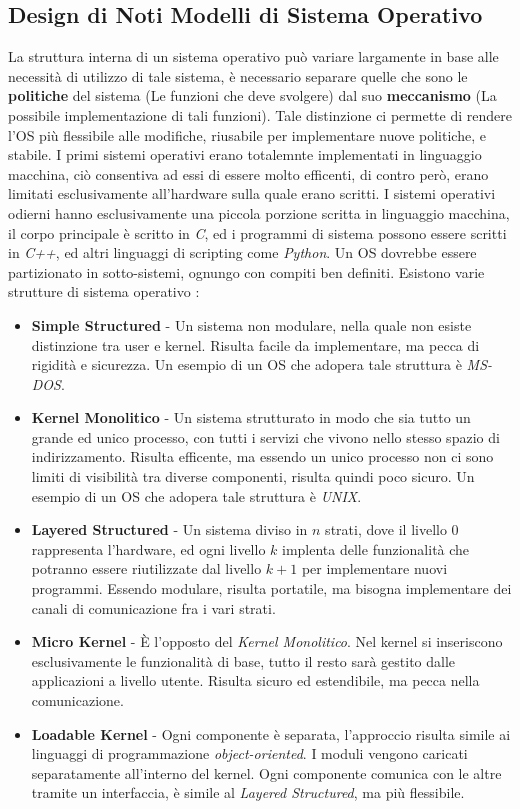 \documentclass[12pt, letterpaper]{article}
\begin{document}
\subsection{Design di Noti Modelli di Sistema Operativo}
La struttura interna di un sistema operativo può variare largamente in base alle necessità di utilizzo 
di tale sistema, è necessario separare quelle che sono le \textbf{politiche} del sistema 
(Le funzioni che deve svolgere) dal suo \textbf{meccanismo} (La possibile implementazione di tali funzioni).
Tale distinzione ci permette di rendere l'OS più flessibile alle modifiche, riusabile per implementare nuove 
politiche, e stabile. I primi sistemi operativi erano totalemnte implementati in linguaggio macchina, ciò 
consentiva ad essi di essere molto efficenti, di contro però, erano limitati esclusivamente all'hardware sulla 
quale erano scritti. I sistemi operativi odierni hanno esclusivamente una piccola porzione scritta in 
linguaggio macchina, il corpo principale è scritto in \textit{C}, ed i programmi di sistema possono essere scritti 
in \textit{C++}, ed altri linguaggi di scripting come \textit{Python}. Un OS dovrebbe essere partizionato 
in sotto-sistemi, ognungo con compiti ben definiti. Esistono varie strutture di sistema operativo :
\begin{itemize}
    \item \textbf{Simple Structured} - Un sistema non modulare, nella quale non esiste distinzione tra 
    user e kernel. Risulta facile da implementare, ma pecca di rigidità e sicurezza. Un esempio di un OS che 
    adopera tale struttura è \textit{MS-DOS}.
    \item \textbf{Kernel Monolitico} - Un sistema strutturato in modo che sia tutto un grande ed unico processo, con
    tutti i servizi che vivono nello stesso spazio di indirizzamento. Risulta efficente,
    ma essendo un unico processo non ci sono limiti di visibilità tra diverse componenti, risulta 
    quindi poco sicuro. Un esempio di un OS che adopera tale struttura è \textit{UNIX}.
    \item \textbf{Layered Structured} - Un sistema diviso in \(n\) strati, dove il livello 0 rappresenta l'hardware, 
    ed ogni livello \(k\) implenta delle funzionalità che potranno essere riutilizzate dal livello \(k+1\) per 
    implementare nuovi programmi. Essendo modulare, risulta portatile, ma bisogna implementare dei canali di 
    comunicazione fra i vari strati.
    \item \textbf{Micro Kernel} - È l'opposto del \textit{Kernel Monolitico}. Nel kernel si inseriscono 
    esclusivamente le funzionalità di base, tutto il resto sarà gestito dalle applicazioni a livello utente. Risulta
    sicuro ed estendibile, ma pecca nella comunicazione. 
    \item \textbf{Loadable Kernel} - Ogni componente è separata, l'approccio risulta simile ai linguaggi 
    di programmazione \textit{object-oriented}. I moduli vengono caricati separatamente all'interno del 
    kernel. Ogni componente comunica con le altre tramite un interfaccia, è simile al \textit{Layered Structured},
    ma più flessibile.
\end{itemize}
\end{document}
